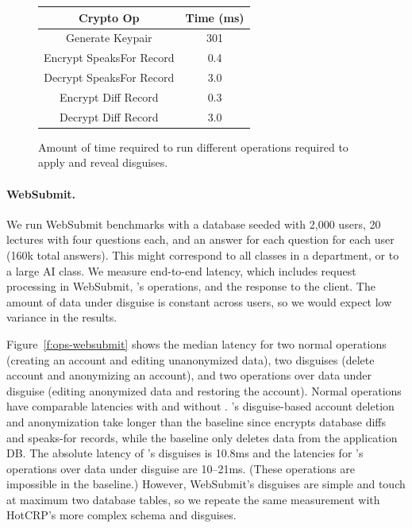 \begin{figure}[t]
\begin{center}
\begin{tabular}{ c c }
\textbf{Crypto Op} & \textbf{Time (ms)}\\
\hline
Generate Keypair & 301\\
Encrypt SpeaksFor Record & 0.4\\
Decrypt SpeaksFor Record & 3.0\\
Encrypt Diff Record & 0.3\\
Decrypt Diff Record & 3.0\\
\end{tabular}
\end{center}
\caption{Amount of time required to run different operations required to apply and reveal disguises.}
\label{f:opstats}
\end{figure}

\paragraph{WebSubmit.}
%
We run WebSubmit benchmarks with a database seeded with 2,000 users, 20
lectures with four questions each, and an answer for each question for
each user (160k total answers).
%
This might correspond to all classes in a department, or to a large AI class.
%
We measure end-to-end latency, which includes request processing in WebSubmit,
\sys's operations, and the response to the client.
%
The amount of data under disguise is constant across users, so we would expect
low variance in the results.
%

%
Figure~\ref{f:ops-websubmit} shows the median latency for two normal operations
(creating an account and editing unanonymized data), two disguises (delete account
and anonymizing an account), and two operations over data under disguise (editing
anonymized data and restoring the account).
%
Normal operations have comparable latencies with and without \sys.
%
\sys's disguise-based account deletion and anonymization take longer than the
baseline since \sys encrypts database diffs and speaks-for records, while
the baseline only deletes data from the application DB.
%
The absolute latency of \sys's disguises is 10.8ms and the latencies for
\sys's operations over data under disguise are 10--21ms.
%
(These operations are impossible in the baseline.)
%
However, WebSubmit's disguises are simple and touch at maximum two database
tables, so we repeate the same measurement with HotCRP's more complex schema and
disguises.
%

